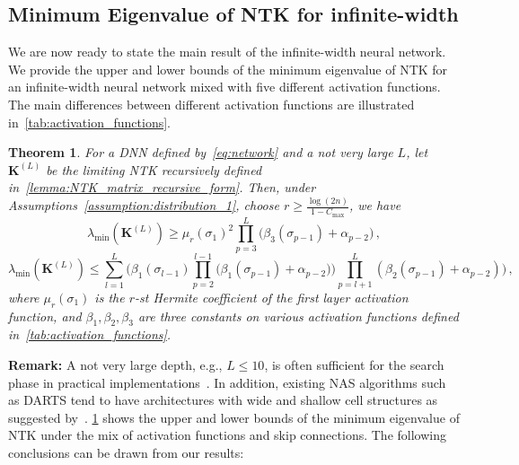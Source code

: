 \documentclass[nohyperref]{article}
\theoremstyle{plain}
\newtheorem{theorem}{Theorem}
\theoremstyle{definition}
\theoremstyle{remark}
\begin{document}
\subsection{Minimum Eigenvalue of NTK for infinite-width}
\label{ssec:Minimum_eigenvalue_NTK_infinite}

We are now ready to state the main result of the infinite-width neural network. We provide the upper and lower bounds of the minimum eigenvalue of NTK for an infinite-width neural network mixed with five different activation functions. The main differences between different activation functions are illustrated in~\cref{tab:activation_functions}.


\begin{theorem}
\label{thm:lambda_min_inf_mixed}
For a DNN defined by~\cref{eq:network} and a not very large $L$, let $\bm{K}^{(L)}$ be the limiting NTK recursively defined in~\cref{lemma:NTK_matrix_recursive_form}. Then, 
under Assumptions~\ref{assumption:distribution_1}, choose $r \geq \frac{\log (2n)}{1-C_{\text{max}}}$, we have
\begin{equation*}
\lambda _{\min}(\bm{K}^{(L)}) \geq \mu_{r}(\sigma_1)^{2}\prod_{p=3}^{L}\Bigg(\beta_3(\sigma_{p-1})+\alpha_{p-2}\Bigg)\,,
\end{equation*}
\begin{equation*}
\lambda _{\min}(\bm{K}^{(L)}) \leq\sum_{l=1}^{L}\Bigg(\beta_1(\sigma_{l-1}) \prod_{p=2}^{l-1} \big(\beta_1(\sigma_{p-1})+\alpha_{p-2}) \big) \prod_{p=l+1}^{L}(\beta_2(\sigma_{p-1})+\alpha_{p-2}) \Bigg) \,, 
\end{equation*}
where $\mu_r(\sigma_1)$ is the $r$-st Hermite coefficient of the first layer activation function, and $\beta_1, \beta_2, \beta_3$ are three constants on various activation functions defined in~\cref{tab:activation_functions}.
\end{theorem}

{\bf Remark:} 
A not very large depth, e.g., $L \leq 10$, is often sufficient for the search phase in practical implementations~\citep{liu2018hierarchical, dong2021nats}. In addition, existing NAS algorithms such as DARTS tend to have architectures with wide and shallow cell structures as suggested by~\citet{Shu2020Understanding}. \cref{thm:lambda_min_inf_mixed} shows the upper and lower bounds of the minimum eigenvalue of NTK under the mix of activation functions and skip connections. The following conclusions can be drawn from our results:
\end{document}
